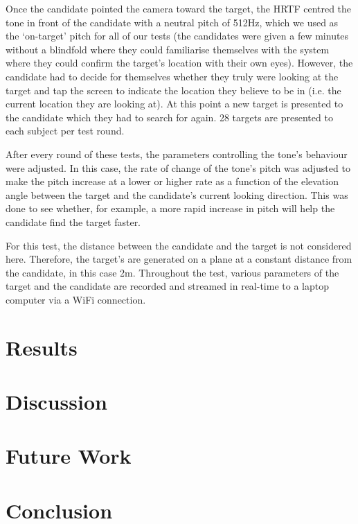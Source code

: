 \documentclass[format=sigconf, review=true, screen=true, anonymous=true]{acmart}
\begin{document}
Once the candidate pointed the camera toward the target, the HRTF centred the tone in front of the candidate with a neutral pitch of 512Hz, which we used as the `on-target' pitch for all of our tests (the candidates were given a few minutes without a blindfold where they could familiarise themselves with the system where they could confirm the target's location with their own eyes). However, the candidate had to decide for themselves whether they truly were looking at the target and tap the screen to indicate the location they believe to be in (i.e. the current location they are looking at). At this point a new target is presented to the candidate which they had to search for again. 28 targets are presented to each subject per test round. 

After every round of these tests, the parameters controlling the tone's behaviour were adjusted. In this case, the rate of change of the tone's pitch was adjusted to make the pitch increase at a lower or higher rate as a function of the elevation angle between the target and the candidate's current looking direction. This was done to see whether, for example, a more rapid increase in pitch will help the candidate find the target faster. 

For this test, the distance between the candidate and the target is not considered here. Therefore, the target's are generated on a plane at a constant distance from the candidate, in this case 2m. Throughout the test, various parameters of the target and the candidate are recorded and streamed in real-time to a laptop computer via a WiFi connection.

\section{Results}

\section{Discussion}

\section{Future Work}

\section{Conclusion}



\end{document}
